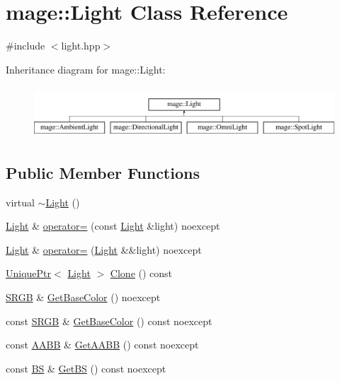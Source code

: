 \hypertarget{classmage_1_1_light}{}\section{mage\+:\+:Light Class Reference}
\label{classmage_1_1_light}


{\ttfamily \#include $<$light.\+hpp$>$}

Inheritance diagram for mage\+:\+:Light\+:\begin{figure}[H]
\begin{center}
\leavevmode
\includegraphics[height=1.944445cm]{classmage_1_1_light}
\end{center}
\end{figure}
\subsection*{Public Member Functions}
\begin{DoxyCompactItemize}
\item 
virtual \hyperlink{classmage_1_1_light_af877bc473dede83689a4bda8a36d4d36}{$\sim$\+Light} ()
\item 
\hyperlink{classmage_1_1_light}{Light} \& \hyperlink{classmage_1_1_light_a853a41931d798c85fe05a55f69883874}{operator=} (const \hyperlink{classmage_1_1_light}{Light} \&light) noexcept
\item 
\hyperlink{classmage_1_1_light}{Light} \& \hyperlink{classmage_1_1_light_ab04daa2ff8f756310d8133470a625a26}{operator=} (\hyperlink{classmage_1_1_light}{Light} \&\&light) noexcept
\item 
\hyperlink{namespacemage_a3316d7143a973e37adf1110f2e80ca31}{Unique\+Ptr}$<$ \hyperlink{classmage_1_1_light}{Light} $>$ \hyperlink{classmage_1_1_light_a4c87e4a361b20519c49b4a0397625a6a}{Clone} () const
\item 
\hyperlink{structmage_1_1_s_r_g_b}{S\+R\+GB} \& \hyperlink{classmage_1_1_light_ab91bc6fe671417f49c63346d1ed83576}{Get\+Base\+Color} () noexcept
\item 
const \hyperlink{structmage_1_1_s_r_g_b}{S\+R\+GB} \& \hyperlink{classmage_1_1_light_a3dfe7de799e39693b7243379650f281f}{Get\+Base\+Color} () const noexcept
\item 
const \hyperlink{structmage_1_1_a_a_b_b}{A\+A\+BB} \& \hyperlink{classmage_1_1_light_a1ce1d4a97857b182e629e0e546beb280}{Get\+A\+A\+BB} () const noexcept
\item 
const \hyperlink{structmage_1_1_b_s}{BS} \& \hyperlink{classmage_1_1_light_ab2365a76f8f3a2ae2c97263ea556a993}{Get\+BS} () const noexcept
\end{DoxyCompactItemize}
